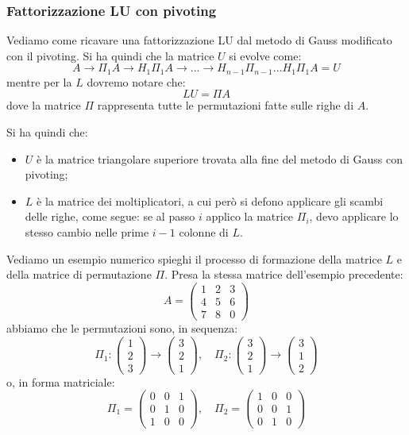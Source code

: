 \documentclass[a4paper,11pt]{article}
\begin{document}
\subsubsection{Fattorizzazione LU con pivoting}
Vediamo come ricavare una fattorizzazione LU dal metodo di Gauss modificato con il pivoting.
Si ha quindi che la matrice $U$ si evolve come:
$$
A \rightarrow \Pi_1 A \rightarrow H_1 \Pi_1 A \rightarrow ... \rightarrow H_{n - 1} \Pi_{n - 1} ... H_1 \Pi_1 A = U 
$$
mentre per la $L$ dovremo notare che:
$$
LU = \Pi A
$$
dove la matrice $\Pi$ rappresenta tutte le permutazioni fatte sulle righe di $A$.

Si ha quindi che:
\begin{itemize}
	\item $U$ è la matrice triangolare superiore trovata alla fine del metodo di Gauss con pivoting;
	\item $L$ è la matrice dei moltiplicatori, a cui però si defono applicare gli scambi delle righe, come segue: se al passo $i$ applico la matrice $\Pi_i$, devo applicare lo stesso cambio nelle prime $i - 1$ colonne di $L$.
\end{itemize}

\par\smalskip 

Vediamo un esempio numerico spieghi il processo di formazione della matrice $L$ e della matrice di permutazione $\Pi$.
Presa la stessa matrice dell'esempio precedente:
$$
A = \begin{pmatrix}
	1 & 2 & 3 \\ 
	4 & 5 & 6 \\ 
	7 & 8 & 0
\end{pmatrix}
$$
abbiamo che le permutazioni sono, in sequenza:
$$
\Pi_1 : 
\begin{pmatrix}
	1 \\ 2 \\ 3
\end{pmatrix}
\rightarrow
\begin{pmatrix}
	3 \\ 2 \\ 1
\end{pmatrix}, \quad 
\Pi_2 :
\begin{pmatrix}
	3 \\ 2 \\ 1
\end{pmatrix}
\rightarrow
\begin{pmatrix}
	3 \\ 1 \\ 2
\end{pmatrix}
$$
o, in forma matriciale:
$$
\Pi_1 = \begin{pmatrix}
	0 & 0 & 1 \\ 
	0 & 1 & 0 \\ 
	1 & 0 & 0
\end{pmatrix}, \quad
\Pi_2 = \begin{pmatrix}
	1 & 0 & 0 \\ 
	0 & 0 & 1 \\ 
	0 & 1 & 0
\end{pmatrix}
$$
\end{document}
